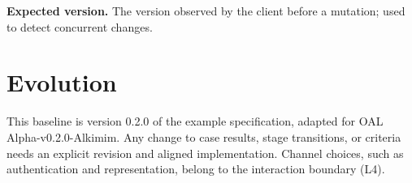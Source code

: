 \documentclass[10pt,a4paper]{article}
\begin{document}
\textbf{Expected version.} The version observed by the client before a mutation; used to detect concurrent changes.

\section{Evolution}

This baseline is version 0.2.0 of the example specification, adapted for OAL Alpha-v0.2.0-Alkimim. Any change to case results, stage transitions, or criteria needs an explicit revision and aligned implementation. Channel choices, such as authentication and representation, belong to the interaction boundary (L4).
\end{document}

